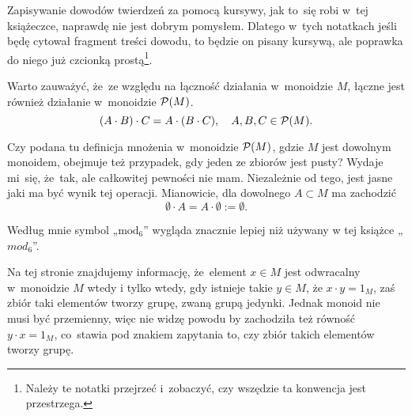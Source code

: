 \documentclass[a4paper,11pt]{article}
\begin{document}
\noindent
Zapisywanie dowodów twierdzeń za pomocą kursywy, jak to~się
robi w~tej książeczce, naprawdę nie jest dobrym pomysłem. Dlatego
w~tych notatkach jeśli będę cytował fragment treści dowodu, to będzie
on pisany kursywą, ale poprawka do niego już czcionką
prostą\footnote{Należy te notatki przejrzeć i~zobaczyć, czy wszędzie
  ta konwencja jest przestrzega.}.

\vspace{\spaceFour}







 Warto zauważyć, że~ze względu na łączność działania
w~monoidzie $M$, łączne jest również działanie w~monoidzie
$\mathcal{P}( M )$.
\begin{equation}
  \label{eq:Forys-Forys-01}
  ( A \cdot B ) \cdot C = A \cdot ( B \cdot C ), \quad
  A, B, C \in \mathcal{P}( M ).
\end{equation}

\vspace{\spaceFour}





 Czy podana tu definicja mnożenia w~monoidzie
$\mathcal{P}( M )$, gdzie $M$ jest dowolnym monoidem, obejmuje też
przypadek, gdy jeden ze zbiorów jest pusty? Wydaje mi~się, że~tak, ale
całkowitej pewności nie mam. Niezależnie od tego, jest jasne jaki ma
być wynik tej operacji. Mianowicie, dla dowolnego $A \subset M$ ma zachodzić
\begin{equation}
  \label{eq:Forys-Forys-02}
  \emptyset \cdot A = A \cdot \emptyset := \emptyset.
\end{equation}

\vspace{\spaceFour}





 Według mnie symbol „$\textrm{mod}_{ 6 }$” wygląda
znacznie lepiej niż używany w tej książce „$mod_{ 6 }$”.

\vspace{\spaceFour}





 Na tej stronie znajdujemy informację, że~element
$x \in M$ jest odwracalny w~monoidzie $M$ wtedy i tylko wtedy, gdy
istnieje takie $y \in M$, że $x \cdot y = 1_{ M }$, zaś zbiór taki
elementów tworzy grupę, zwaną grupą jedynki. Jednak monoid nie musi
być przemienny, więc nie widzę powodu by zachodziła też równość
$y \cdot x = 1_{ M }$, co~stawia pod znakiem zapytania to, czy zbiór
takich elementów tworzy grupę.
\end{document}
